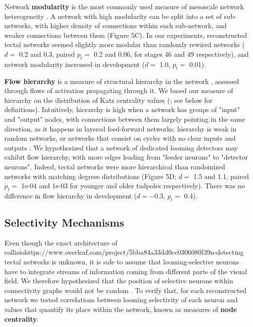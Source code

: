 \documentclass{article}
\begin{document}
Network \textbf{modularity} is the most commonly used measure of mesoscale network heterogeneity \citep{newman2006modularity, leicht2008community}. A network with high modularity can be split into a set of sub-networks, with higher density of connections within each sub-network, and weaker connections between them (Figure 5C). In our experiments, reconstructed tectal networks seemed slightly more modular than randomly rewired networks ($d=$ 0.2 and 0.3, paired $p_t=$ 0.2 and 0.06, for stages 46 and 49 respectively), and network modularity increased in development ($d=$ 1.0, $p_t =$ 0.01).

\textbf{Flow hierarchy} is a measure of structural hierarchy in the network \citep{mones2012hierarchy}, assessed through flows of activation propagating through it. We based our measure of hierarchy on the distribution of Katz centrality values (\citealt{katz1953original, fletcher2018katz}; see below for definitions). Intuitively, hierarchy is high when a network has groups of "input" and "output" nodes, with connections between them largely pointing in the same direction, as it happens in layered feed-forward networks; hierarchy is weak in random networks, or networks that consist on cycles with no clear inputs and outputs \citep{czegel2015hierarchy}. We hypothesized that a network of dedicated looming detectors may exhibit flow hierarchy, with more edges leading from "feeder neurons" to "detector neurons". Indeed, tectal networks were more hierarchical than randomized networks with matching degrees distributions (Figure 5D; $d=$ 1.5 and 1.1, paired $p_t=$ 1e-04 and 1e-03 for younger and older tadpoles respectively). There was no difference in flow hierarchy in development ($d=-$0.3, $p_t=$ 0.4).

\subsection*{Selectivity Mechanisms}

Even though the exact architecture of collisiohttps://www.overleaf.com/project/5bba84a33dd0cc0306080f39n-detecting tectal networks is unknown, it is safe to assume that looming-selective neurons have to integrate streams of information coming from different parts of the visual field. We therefore hypothesized that the position of selective neurons within connectivity graphs would not be random \citep{timme2016degree}. To verify that, for each reconstructed network we tested correlations between looming selectivity of each neuron and values that quantify its place within the network, known as measures of \textbf{node centrality}.
\end{document}
